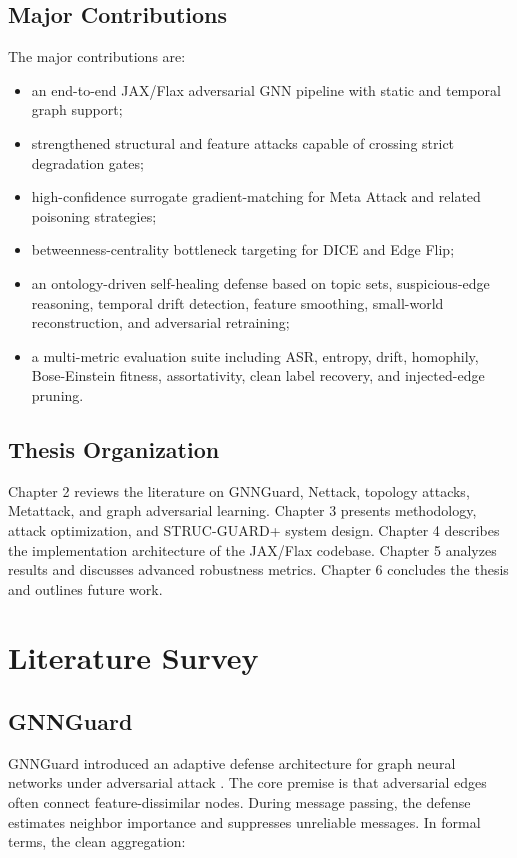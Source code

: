 \documentclass[12pt,oneside]{report}
\begin{document}
\section{Major Contributions}
The major contributions are:
\begin{itemize}
    \item an end-to-end JAX/Flax adversarial GNN pipeline with static and temporal graph support;
    \item strengthened structural and feature attacks capable of crossing strict degradation gates;
    \item high-confidence surrogate gradient-matching for Meta Attack and related poisoning strategies;
    \item betweenness-centrality bottleneck targeting for DICE and Edge Flip;
    \item an ontology-driven self-healing defense based on topic sets, suspicious-edge reasoning, temporal drift detection, feature smoothing, small-world reconstruction, and adversarial retraining;
    \item a multi-metric evaluation suite including ASR, entropy, drift, homophily, Bose-Einstein fitness, assortativity, clean label recovery, and injected-edge pruning.
\end{itemize}

\section{Thesis Organization}
Chapter 2 reviews the literature on GNNGuard, Nettack, topology attacks, Metattack, and graph adversarial learning. Chapter 3 presents methodology, attack optimization, and STRUC-GUARD+ system design. Chapter 4 describes the implementation architecture of the JAX/Flax codebase. Chapter 5 analyzes results and discusses advanced robustness metrics. Chapter 6 concludes the thesis and outlines future work.

\chapter{Literature Survey}

\section{GNNGuard}
GNNGuard introduced an adaptive defense architecture for graph neural networks under adversarial attack \cite{zhang2020gnnguard}. The core premise is that adversarial edges often connect feature-dissimilar nodes. During message passing, the defense estimates neighbor importance and suppresses unreliable messages. In formal terms, the clean aggregation:
\end{document}
